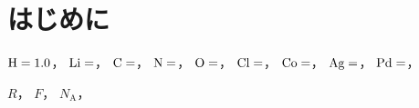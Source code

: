 \documentclass[11pt, a4paper, titlepage]{ltjsarticle}
\numberwithin{equation}{section}
\renewcommand{\rm}[1]{\mathrm{#1}}
\begin{document}
\section*{はじめに}

$\ce{H} = 1.0$，
$\ce{Li} = $，
$\ce{C} = $，
$\ce{N} = $，
$\ce{O} = $，
$\ce{Cl} = $，
$\ce{Co} = $，
$\ce{Ag} = $，
$\ce{Pd} = $，

$R$，
$F$，
$N_{\rm{A}}$，

\section{}\label{sec:1}
\end{document}

